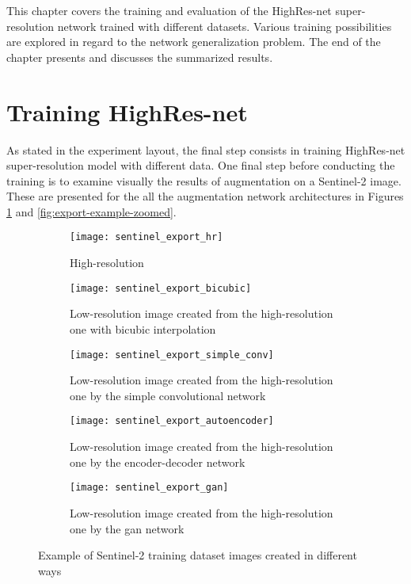 This chapter covers the training and evaluation of the HighRes-net super-resolution network trained with different datasets.
Various training possibilities are explored in regard to the network generalization problem.
The end of the chapter presents and discusses the summarized results.

\section{Training HighRes-net}
As stated in the experiment layout, the final step consists in training HighRes-net super-resolution model with different data.
One final step before conducting the training is to examine visually the results of augmentation on a Sentinel-2 image.
These are presented for the all the augmentation network architectures in Figures \ref{fig:export-example} and \ref{fig:export-example-zoomed}.
\begin{figure}
    \begin{subfigure}[t]{0.3\textwidth}
        \centering
        \texttt{[image: sentinel\_export\_hr]}
        \caption{High-resolution}
    \end{subfigure}
    \hfill
    \begin{subfigure}[t]{0.3\textwidth}
        \centering
        \texttt{[image: sentinel\_export\_bicubic]}
        \caption{Low-resolution image created from the high-resolution one with bicubic interpolation}
    \end{subfigure}
    \hfill
    \begin{subfigure}[t]{0.3\textwidth}
        \centering
        \texttt{[image: sentinel\_export\_simple\_conv]}
        \caption{Low-resolution image created from the high-resolution one by the simple convolutional network}
    \end{subfigure}
    \hfill
    \medskip
    \centering
    \hfill
    \begin{subfigure}[t]{0.3\textwidth}
        \centering
        \texttt{[image: sentinel\_export\_autoencoder]}
        \caption{Low-resolution image created from the high-resolution one by the encoder-decoder network}
    \end{subfigure}
    \quad
    \begin{subfigure}[t]{0.3\textwidth}
        \centering
        \texttt{[image: sentinel\_export\_gan]}
        \caption{Low-resolution image created from the high-resolution one by the \gls{gan} network}
    \end{subfigure}
    \hfill
    \caption{Example of Sentinel-2 training dataset images created in different ways}
    \label{fig:export-example}
\end{figure}
